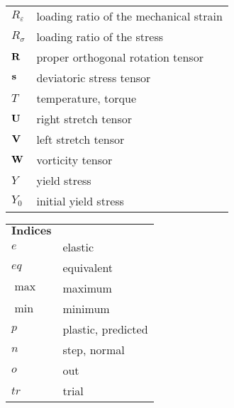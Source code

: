 \begin{table}[htb]
\begin{tabular}{p{3cm}p{10.5cm}}
    $R_{\varepsilon}$ & loading ratio of the mechanical strain \\
    $R_{\sigma}$ & loading ratio of the stress \\
    $\bf{R}$ & proper orthogonal rotation tensor \\
    $\bf{s}$ & deviatoric stress tensor \\
    $T$ & temperature, torque \\
    $\bf{U}$ & right stretch tensor \\
    $\bf{V}$ & left stretch tensor \\
    $\bf{W}$ & vorticity tensor \\
    $Y$ & yield stress \\
    $Y_0$ & initial yield stress \\
    \end{tabular}%
  \label{Tab:latin_1}%
\end{table}%

\begin{table}[htb]
  \centering
    \begin{tabular}{p{3cm}p{10.5cm}}
    $\textbf{Indices}$ & \\
    $e$  & elastic \\
    $eq$  & equivalent \\
    $\max$  & maximum \\
    $\min$  & minimum \\
    $p$  & plastic, predicted \\
    $n$  & step, normal \\
    $o$  & out \\
    $tr$  & trial \\
    \end{tabular}%
  \label{Tab:indices}%
\end{table}%

